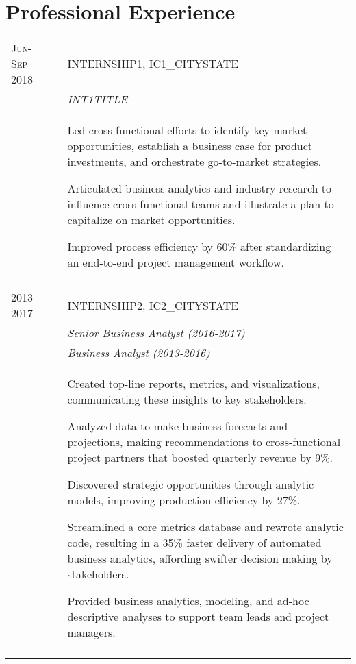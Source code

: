 \documentclass[a4paper,10pt]{article}
\begin{document}
\section{Professional Experience}
\begin{supertabular}{l p{0.55cm} p{13.9cm}}


	\textsc{Jun-Sep 2018}	&& \textsc{INTERNSHIP1}, IC1_CITYSTATE \\
												&& \small	\emph{INT1TITLE} \\
												&& \begin{enumerate*}[label =$\diamond$, itemjoin={\newline}]
														\item \footnotesize Led cross-functional efforts to identify key market opportunities, establish a business case for product investments, and orchestrate go-to-market strategies.
														\item \footnotesize Articulated business analytics and industry research to influence cross-functional teams and illustrate a plan to capitalize on market opportunities.
														\item \footnotesize Improved process efficiency by 60\% after standardizing an end-to-end project management workflow.
													\end{enumerate*} \\
	 \\




	\textsc{2013-2017}		&& \textsc{INTERNSHIP2}, IC2_CITYSTATE \\
												&& \small	\emph{Senior Business Analyst (2016-2017)} \\
												&& \small	\emph{Business Analyst (2013-2016)} \\
												&& \begin{enumerate*}[label =$\diamond$, itemjoin={\newline}]
														\item \footnotesize Created top-line reports, metrics, and visualizations, communicating these insights to key stakeholders.
														\item \footnotesize Analyzed data to make business forecasts and projections, making recommendations to cross-functional project partners that boosted quarterly revenue by 9\%.
														\item \footnotesize Discovered strategic opportunities through analytic models, improving production efficiency by 27\%.
														\item \footnotesize Streamlined a core metrics database and rewrote analytic code, resulting in a 35\% faster delivery of automated business analytics, affording swifter decision making by stakeholders.
														\item \footnotesize Provided business analytics, modeling, and ad-hoc descriptive analyses to support team leads and project managers.
													\end{enumerate*} \\
	 \\




\end{supertabular}
\end{document}
